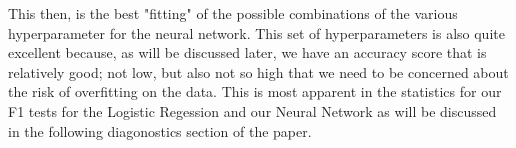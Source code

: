 This then, is the best "fitting" of the possible combinations of the various hyperparameter for the neural network.
This set of hyperparameters is also quite excellent because, as will be discussed later, we have an accuracy score that is relatively good; not low, but also not so high that we need to be concerned about the risk of overfitting on the data.
This is most apparent in the statistics for our F1 tests for the Logistic Regession and our Neural Network as will be discussed in the following diagonostics section of the paper.

